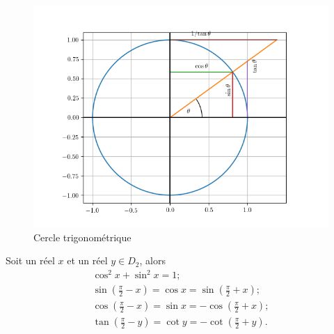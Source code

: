 \begin{figure}
\centering
\includegraphics[scale=0.7]{./CercleTrigo.png}
\caption{Cercle trigonométrique}
\label{fig:cercletrigo}
\end{figure}
%
Soit un réel \(x\) et un réel \(y \in D_2\), alors
\begin{gather}
  \cos^2 x+\sin^2 x=1;\\
  \sin \left(\frac{\pi}{2}-x\right)=\cos x=\sin \left(\frac{\pi}{2}+x\right); \\
  \cos \left(\frac{\pi}{2}-x\right)=\sin x=-\cos\left(\frac{\pi}{2}+x\right);\\
  \tan \left(\frac{\pi}{2}-y \right)=\cot y=-\cot \left(\frac{\pi}{2}+y\right).
\end{gather}
